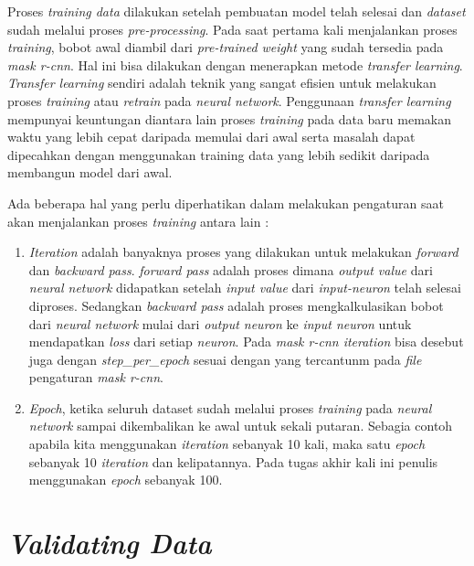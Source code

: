 Proses \textit{training data} dilakukan setelah pembuatan model telah selesai dan \textit{dataset} sudah melalui proses \textit{pre-processing}. Pada saat pertama kali menjalankan proses \textit{training}, bobot awal diambil dari \textit{pre-trained weight} yang sudah tersedia pada \textit{mask r-cnn}. Hal ini bisa dilakukan dengan menerapkan metode \textit{transfer learning}. \textit{Transfer learning} sendiri adalah teknik yang
sangat efisien untuk melakukan proses \textit{training} atau \textit{retrain} pada \textit{neural network}. Penggunaan \textit{transfer learning} mempunyai keuntungan diantara lain proses \textit{training} pada data baru memakan waktu yang lebih cepat daripada memulai dari awal serta masalah dapat dipecahkan dengan menggunakan training data
yang lebih sedikit daripada membangun model dari awal.

Ada beberapa hal yang perlu diperhatikan dalam melakukan pengaturan saat akan menjalankan proses \textit{training} antara lain :
\begin{enumerate}
	\item \textit{Iteration} adalah banyaknya proses yang dilakukan untuk melakukan \textit{forward} dan \textit{backward pass}. \textit{forward pass} adalah proses dimana \textit{output value} dari \textit{neural network} didapatkan setelah \textit{input value} dari \textit{input-neuron} telah selesai diproses. Sedangkan \textit{backward pass} adalah proses mengkalkulasikan bobot dari \textit{neural network} mulai dari \textit{output neuron} ke \textit{input neuron} untuk mendapatkan \textit{loss} dari setiap \textit{neuron}. Pada \textit{mask r-cnn iteration} bisa desebut juga dengan \textit{step\_per\_epoch} sesuai dengan yang tercantunm pada \textit{file} pengaturan \textit{mask r-cnn}. 
	
	\item \textit{Epoch}, ketika seluruh dataset sudah melalui proses \textit{training} pada \textit{neural network} sampai dikembalikan ke awal untuk sekali putaran. Sebagia contoh apabila kita menggunakan \textit{iteration} sebanyak 10 kali, maka satu \textit{epoch} sebanyak 10 \textit{iteration} dan kelipatannya. Pada tugas akhir kali ini penulis menggunakan \textit{epoch} sebanyak 100.
\end{enumerate}   

\section{\textit{Validating Data}
	\label{sec:validatingdata}}

